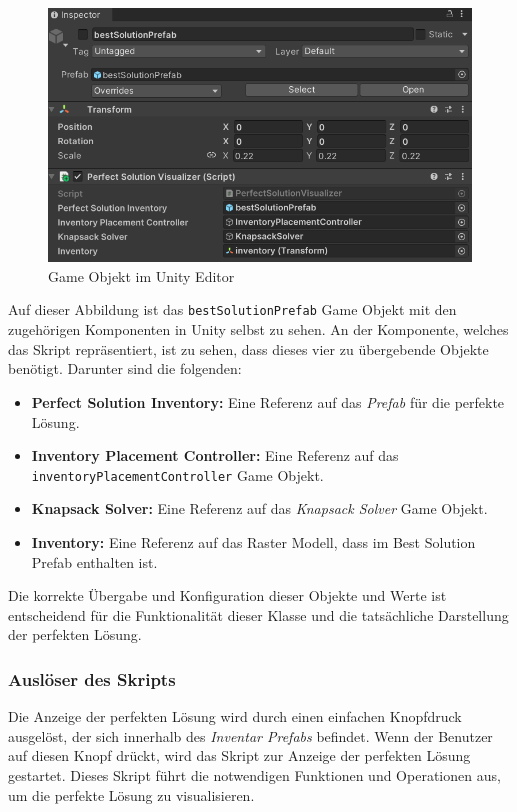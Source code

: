 \begin{itemize}
\begin{figure}[H]
    \centering
    \includegraphics[scale=0.8]{images/bestSolPref_Editor}
    \caption{Game Objekt im Unity Editor}
    \label{fig:bestSol_Editor}
\end{figure}

Auf dieser Abbildung ist das \texttt{bestSolutionPrefab} Game Objekt mit den zugehörigen Komponenten in Unity selbst zu
sehen. An der Komponente, welches das Skript repräsentiert, ist zu sehen, dass dieses vier zu übergebende Objekte benötigt.
Darunter sind die folgenden:
\begin{itemize}
    \item \textbf{Perfect Solution Inventory:} Eine Referenz auf das \textit{Prefab} für die perfekte Lösung.
    \item \textbf{Inventory Placement Controller:} Eine Referenz auf das \texttt{inventoryPlacementController} Game Objekt.
    \item \textbf{Knapsack Solver:} Eine Referenz auf das \textit{Knapsack Solver} Game Objekt.
    \item \textbf{Inventory:} Eine Referenz auf das Raster Modell, dass im Best Solution Prefab enthalten ist.
\end{itemize}

Die korrekte Übergabe und Konfiguration dieser Objekte und Werte ist entscheidend für die Funktionalität dieser Klasse
und die tatsächliche Darstellung der perfekten Lösung.

\subsubsection{Auslöser des Skripts}
Die Anzeige der perfekten Lösung wird durch einen einfachen Knopfdruck ausgelöst, der sich innerhalb des \textit{Inventar Prefabs}
befindet. Wenn der Benutzer auf diesen Knopf drückt, wird das Skript zur Anzeige der perfekten Lösung gestartet. Dieses
Skript führt die notwendigen Funktionen und Operationen aus, um die perfekte Lösung zu visualisieren.


\end{itemize}
